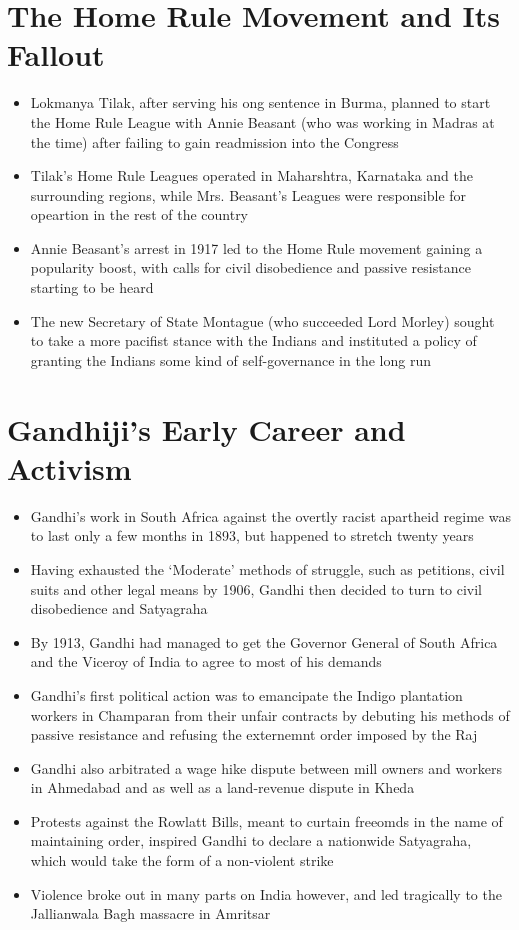 \section{The Home Rule Movement and Its Fallout}
\begin{itemize}
    \item Lokmanya Tilak, after serving his ong sentence in Burma, planned to start the Home Rule League with Annie Beasant (who was working in Madras at the time) after failing to gain readmission into the Congress
    \item Tilak's Home Rule Leagues operated in Maharshtra, Karnataka and the surrounding regions, while Mrs. Beasant's Leagues were responsible for opeartion in the rest of the country
    \item Annie Beasant's arrest in 1917 led to the Home Rule movement gaining a popularity boost, with calls for civil disobedience and passive resistance starting to be heard
    \item The new Secretary of State Montague (who succeeded Lord Morley) sought to take a more pacifist stance with the Indians and instituted a policy of granting the Indians some kind of self-governance in the long run
\end{itemize}

\section{Gandhiji’s Early Career and Activism}
\begin{itemize}
    \item Gandhi's work in South Africa against the overtly racist apartheid regime was to last only a few months in 1893, but happened to stretch twenty years
    \item Having exhausted the `Moderate' methods of struggle, such as petitions, civil suits and other legal means by 1906, Gandhi then decided to turn to civil disobedience and Satyagraha
    \item By 1913, Gandhi had managed to get the Governor General of South Africa and the Viceroy of India to agree to most of his demands
    \item Gandhi's first political action was to emancipate the Indigo plantation workers in Champaran from their unfair contracts by debuting his methods of passive resistance and refusing the externemnt order imposed by the Raj
    \item Gandhi also arbitrated a wage hike dispute between mill owners and workers in Ahmedabad and as well as a land-revenue dispute in Kheda
    \item Protests against the Rowlatt Bills, meant to curtain freeomds in the name of maintaining order, inspired Gandhi to declare a nationwide Satyagraha, which would take the form of a non-violent strike
    \item Violence broke out in many parts on India however, and led tragically to the Jallianwala Bagh massacre in Amritsar
\end{itemize}

